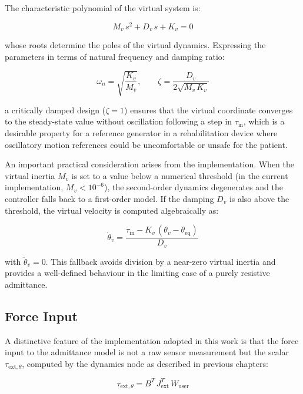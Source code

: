 The characteristic polynomial of the virtual system is:

\begin{equation}
    M_v\,s^2 + D_v\,s + K_v = 0
\end{equation}

whose roots determine the poles of the virtual dynamics. Expressing the parameters in terms of natural frequency and damping ratio:

\begin{equation}
    \omega_n = \sqrt{\frac{K_v}{M_v}}, \qquad
\zeta   = \frac{D_v}{2\sqrt{M_v\,K_v}}
\end{equation}

a critically damped design ($\zeta = 1$) ensures that the virtual coordinate converges to the steady-state value without oscillation following a step in $\tau_{\mathrm{in}}$, which is a desirable property for a reference generator in a rehabilitation device where oscillatory motion references could be uncomfortable or unsafe for the patient.
 
An important practical consideration arises from the implementation. When the virtual inertia $M_v$ is set to a value below a numerical threshold (in the current implementation, $M_v < 10^{-6}$), the second-order dynamics degenerates and the controller falls back to a first-order model. If the damping $D_v$ is also above the threshold, the virtual velocity is computed algebraically as:

\begin{equation}
    \dot\theta_v = \frac{\tau_{\mathrm{in}} - K_v\,(\theta_v - \theta_{\mathrm{eq}})}{D_v}
\end{equation}

with $\ddot\theta_v = 0$. This fallback avoids division by a near-zero virtual inertia and provides a well-defined behaviour in the limiting case of a purely resistive admittance.

\subsection{Force Input}
A distinctive feature of the implementation adopted in this work is that the force input to the admittance model is not a raw sensor measurement but the scalar $\tau_{\mathrm{ext},\theta}$, computed by the dynamics node as described in previous chapters:

\begin{equation}
    \tau_{\mathrm{ext},\theta} = B^T\,J_{\mathrm{ext}}^T\,W_{\mathrm{user}}
\end{equation}

